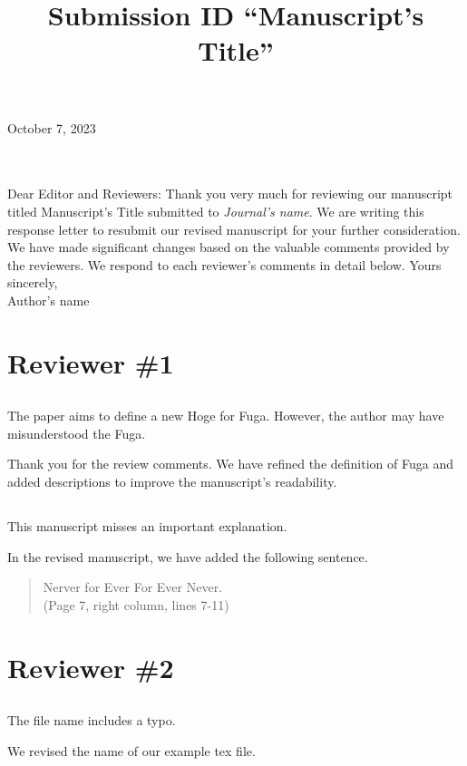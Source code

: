 \documentclass{ar2rc}
\title{Submission ID ``Manuscript's Title''}
\begin{document}
October 7, 2023\\
\\
\\
\maketitle
{}\baselineskip
Dear Editor and Reviewers: 
\baselineskip
Thank you very much for reviewing our manuscript titled Manuscript's Title submitted to {\it Journal's name}. 
We are writing this response letter to resubmit our revised manuscript for your further consideration. 
We have made significant changes based on the valuable comments provided by the reviewers.
We respond to each reviewer's comments in detail below.
\baselineskip
Yours sincerely, \\ 
Author's name
\clearpage

\section{Reviewer \#1}
\subsection*{}
\RC  The paper aims to define a new Hoge for Fuga. However, the author may have misunderstood the Fuga. 

\AR Thank you for the review comments. We have refined the definition of Fuga and added descriptions to improve the manuscript's readability.


\subsection*{}
\RC  This manuscript misses an important explanation. 

\AR In the revised manuscript, we have added the following sentence. 
\begin{quote}
 Nerver for Ever For Ever Never.\\ 
(Page 7, right column, lines 7-11)
\end{quote}


\section{Reviewer \#2}
\subsection*{}
\RC  The file name includes a typo.

\AR  We revised the name of our example tex file.
\end{document}
